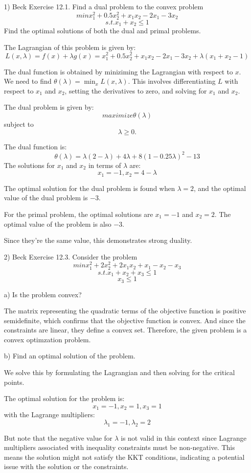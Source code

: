 \documentclass{article}
\begin{document}
1) Beck Exercise 12.1. Find a dual problem to the convex problem
\[min x_1^2 + 0.5x_2^2 + x_1 x_2 - 2x_1 - 3x_2\]
\[s.t. x_1 + x_2 \leq 1\]
Find the optimal solutions of both the dual and primal problems.

The Lagrangian of this problem is given by:
\[L(x, \lambda) = f(x) + \lambda g(x) = x_1^2 + 0.5x_2^2 + x_1 x_2 - 2x_1 - 3x_2 + \lambda (x_1 + x_2 - 1)\]

The dual function is obtained by miniziming the Lagrangian with respect to $x$.
We need to find $\theta(\lambda) = \min_x L(x, \lambda)$. This involves differentiating
$L$ with respect to $x_1$ and $x_2$, setting the derivatives to zero, and solving
for $x_1$ and $x_2$.

The dual problem is given by:
\[maximize \theta(\lambda)\]
subject to
\[\lambda \geq 0.\]

The dual function is:
\[\theta(\lambda) = \lambda(2 - \lambda) + 4 \lambda + 8(1-0.25 \lambda)^2 - 13\]
The solutions for $x_1$ and $x_2$ in terms of $\lambda$ are:
\[x_1 = -1, x_2 = 4 - \lambda\]

The optimal solution for the dual problem is found when $\lambda = 2$, and
the optimal value of the dual problem is $-3$.

For the primal problem, the optimal solutions are $x_1 = -1$ and $x_2 = 2$.
The optimal value of the problem is also $-3$.

Since they're the same value, this demonstrates strong duality.


2) Beck Exercise 12.3. Consider the problem
\[min x_1^2 + 2x_2^2 + 2x_1 x_2 + x_1 - x_2 - x_3\]
\[s.t. x_1 + x_2 + x_3 \leq 1\]
\[x_3 \leq 1\]

a) Is the problem convex?

The matrix representing the quadratic terms of the objective function
is positive semidefinite, which confirms that the objective function is convex.
And since the constraints are linear, they define a convex set. Therefore,
the given problem is a convex optimzation problem.

b) Find an optimal solution of the problem.

We solve this by formulating the Lagrangian and then solving for the critical points.

The optimal solution for the problem is:
\[x_1 = -1, x_2 = 1, x_3 = 1\]
with the Lagrange multipliers:
\[\lambda_1 = -1, \lambda_2 = 2\]

But note that the negative value for $\lambda$ is not valid in this context
since Lagrange multipliers associated with inequality constraints must be non-negative.
This means the solution might not satisfy the KKT conditions, indicating a potential issue
with the solution or the constraints.
\end{document}
